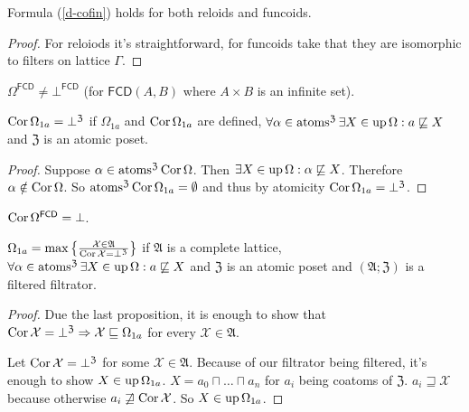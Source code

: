 \begin{cor}
  Formula (\ref{d-cofin}) holds for both reloids and funcoids.
\end{cor}

\begin{proof}
  For reloiods it's straightforward, for funcoids take that they are
  isomorphic to filters on lattice $\Gamma$.
\end{proof}

\begin{cor}
$\Omega^{\mathsf{FCD}} \ne \bot^{\mathsf{FCD}}$ (for $\mathsf{FCD}(A,B)$ where $A\times B$ is an infinite set).
\end{cor}

\begin{prop}\label{omega-bot}
  $\operatorname{Cor} \Omega_{1 a} = \bot^{\mathfrak{Z}}$ if
  $\Omega_{1 a}$ and $\operatorname{Cor} \Omega_{1 a}$ are defined,
  $\forall \alpha \in
  \operatorname{atoms}^{\mathfrak{Z}} \exists X \in \operatorname{up} \Omega : a
  \not\sqsubseteq X$ and $\mathfrak{Z}$ is an atomic poset.
\end{prop}

\begin{proof}
  Suppose $\alpha \in \operatorname{atoms}^{\mathfrak{Z}} \operatorname{Cor} \Omega$. Then
  $\exists X \in \operatorname{up} \Omega : \alpha \not\sqsubseteq X$.
  Therefore $\alpha \notin \operatorname{Cor} \Omega$. So $\operatorname{atoms}^{\mathfrak{Z}}
  \operatorname{Cor} \Omega_{1 a} = \emptyset$ and thus by atomicity $\operatorname{Cor}
  \Omega_{1 a} = \bot^{\mathfrak{Z}}$.
\end{proof}

\begin{cor}
  $\operatorname{Cor} \Omega^{\mathsf{FCD}} = \bot$.
\end{cor}

\begin{prop}
  $\Omega_{1 a} = \max \left\{ \frac{ \mathcal{X} \in \mathfrak{A} }{
  \operatorname{Cor} \mathcal{X} = \bot^{\mathfrak{Z}} }\right\}$ if $\mathfrak{A}$ is
  a complete lattice,
  $\forall \alpha \in \operatorname{atoms}^{\mathfrak{Z}} \exists X \in \operatorname{up}
  \Omega : a \not\sqsubseteq X$ and $\mathfrak{Z}$ is an atomic
  poset and $(\mathfrak{A}; \mathfrak{Z})$ is a filtered filtrator.
\end{prop}

\begin{proof}
  Due the last proposition, it is enough to show that $\operatorname{Cor} \mathcal{X}
  = \bot^{\mathfrak{Z}} \Rightarrow \mathcal{X} \sqsubseteq \Omega_{1 a}$ for
  every $\mathcal{X} \in \mathfrak{A}$.
  
  Let $\operatorname{Cor} \mathcal{X} = \bot^{\mathfrak{Z}}$ for some $\mathcal{X} \in
  \mathfrak{A}$. Because of our filtrator being filtered, it's enough to show
  $X \in \operatorname{up} \Omega_{1 a}$. $X = a_0 \sqcap \ldots \sqcap a_n$ for $a_i$
  being coatoms of $\mathfrak{Z}$. $a_i \sqsupseteq \mathcal{X}$ because
  otherwise $a_i \not\sqsupseteq \operatorname{Cor} \mathcal{X}$. So $X
  \in \operatorname{up} \Omega_{1 a}$.
\end{proof}

